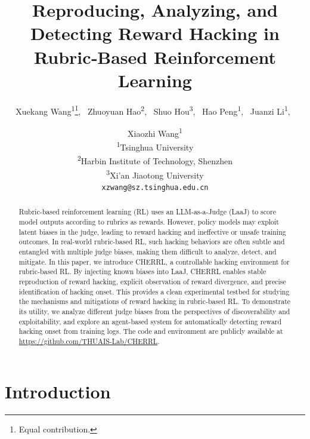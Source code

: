 \documentclass[11pt]{article}
\title{Reproducing, Analyzing, and Detecting Reward Hacking in \\ Rubric‑Based Reinforcement Learning}
\author{
  Xuekang Wang\textsuperscript{1}\thanks{Equal contribution.},~
  Zhuoyuan Hao\textsuperscript{2}\footnotemark[1],~
  Shuo Hou\textsuperscript{3},~
  Hao Peng\textsuperscript{1},~
  Juanzi Li\textsuperscript{1},~\and
  Xiaozhi Wang\textsuperscript{1} \\
  \textsuperscript{1}Tsinghua University \\
  \textsuperscript{2}Harbin Institute of Technology, Shenzhen \\
  \textsuperscript{3}Xi'an Jiaotong University \\
  \texttt{xzwang@sz.tsinghua.edu.cn}
}
\newcommand{\ourenv}{CHERRL\xspace}
\begin{document}
\maketitle
\begin{abstract}
Rubric-based reinforcement learning (RL) uses an LLM-as-a-Judge (LaaJ) to score model outputs according to rubrics as rewards. However, policy models may exploit latent biases in the judge, leading to reward hacking and ineffective or unsafe training outcomes. In real-world rubric-based RL, such hacking behaviors are often subtle and entangled with multiple judge biases, making them difficult to analyze, detect, and mitigate. In this paper, we introduce \ourenv, a controllable hacking environment for rubric-based RL. By injecting known biases into LaaJ, CHERRL enables stable reproduction of reward hacking, explicit observation of reward divergence, and precise identification of hacking onset. This provides a clean experimental testbed for studying the mechanisms and mitigations of reward hacking in rubric-based RL. To demonstrate its utility, we analyze different judge biases from the perspectives of discoverability and exploitability, and explore an agent-based system for automatically detecting reward hacking onset from training logs.
The code and environment are publicly available at \url{https://github.com/THUAIS-Lab/CHERRL}.





\end{abstract}
\section{Introduction}
\end{document}
